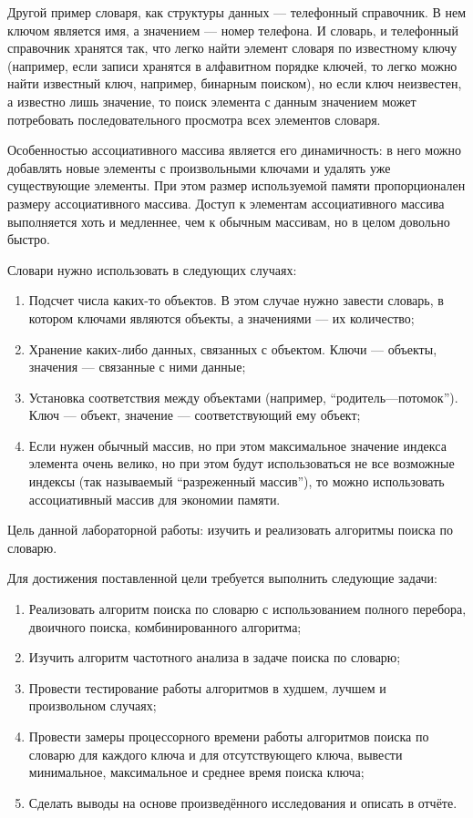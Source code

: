 \documentclass[12pt]{report}
\begin{document}
Другой пример словаря, как структуры данных — телефонный справочник. В нем ключом является имя, а значением — номер телефона. И словарь, и телефонный справочник хранятся так, что легко найти элемент словаря по известному ключу (например, если записи хранятся в алфавитном порядке ключей, то легко можно найти известный ключ, например, бинарным поиском), но если ключ неизвестен, а известно лишь значение, то поиск элемента с данным значением может потребовать последовательного просмотра всех элементов словаря.

Особенностью ассоциативного массива является его динамичность: в него можно добавлять новые элементы с произвольными ключами и удалять уже существующие элементы. При этом размер используемой памяти пропорционален размеру ассоциативного массива. Доступ к элементам ассоциативного массива выполняется хоть и медленнее, чем к обычным массивам, но в целом довольно быстро.

Словари нужно использовать в следующих случаях:
\begin{enumerate}
	\item Подсчет числа каких-то объектов. В этом случае нужно завести словарь, в котором ключами являются объекты, а значениями — их количество;
	\item Хранение каких-либо данных, связанных с объектом. Ключи — объекты, значения — связанные с ними данные;
	\item Установка соответствия между объектами (например, “родитель—потомок”). Ключ — объект, значение — соответствующий ему объект;
	\item Если нужен обычный массив, но при этом максимальное значение индекса элемента очень велико, но при этом будут использоваться не все возможные индексы (так называемый “разреженный массив”), то можно использовать ассоциативный массив для экономии памяти.
	
\end{enumerate}

\newpage

Цель данной лабораторной работы: изучить и реализовать алгоритмы поиска по словарю.

Для достижения поставленной цели требуется выполнить следующие задачи:
\begin{enumerate}
	\item Реализовать алгоритм поиска по словарю с использованием полного перебора, двоичного поиска, комбинированного алгоритма;
	
	\item Изучить алгоритм частотного анализа в задаче поиска по словарю;
	
	\item Провести тестирование работы алгоритмов в худшем, лучшем и произвольном случаях;
	
	\item Провести замеры процессорного времени работы алгоритмов поиска по словарю для каждого ключа и для отсутствующего ключа, вывести минимальное, максимальное и среднее время поиска ключа;
	
	\item Сделать выводы на основе произведённого исследования и описать в отчёте.
	
\end{enumerate}
\end{document}
